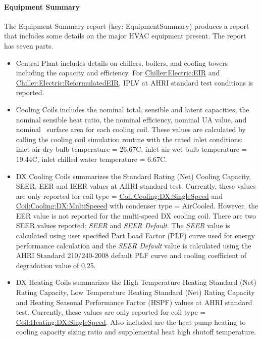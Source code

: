 \paragraph{Equipment Summary}\label{equipment-summary}

The Equipment Summary report (key: EquipmentSummary) produces a report that includes some details on the major HVAC equipment present. The report has seven parts.

\begin{itemize}
\item
  Central Plant includes details on chillers, boilers, and cooling towers including the capacity and efficiency. For \hyperref[chillerelectriceir]{Chiller:Electric:EIR} and \hyperref[chillerelectricreformulatedeir]{Chiller:Electric:ReformulatedEIR}, IPLV at AHRI standard test conditions is reported.
\item
  Cooling Coils includes the nominal total, sensible and latent capacities, the nominal sensible heat ratio, the nominal efficiency, nominal UA value, and nominal~ surface area for each cooling coil. These values are calculated by calling the cooling coil simulation routine with the rated inlet conditions: inlet air dry bulb temperature = 26.67C, inlet air wet bulb temperature = 19.44C, inlet chilled water temperature = 6.67C.
\item
  DX Cooling Coils summarizes the Standard Rating (Net) Cooling Capacity, SEER, EER and IEER values at AHRI standard test. Currently, these values are only reported for coil type = \hyperref[coilcoolingdxsinglespeed]{Coil:Cooling:DX:SingleSpeed} and \hyperref[coilcoolingdxmultispeed]{Coil:Cooling:DX:MultiSpeeed} with condenser type = AirCooled. However, the EER value is not reported for the multi-speed DX cooling coil. There are two SEER values reported: \textit{SEER} and \textit{SEER Default}. The \textit{SEER} value is calculated using user specified Part Load Factor (PLF) curve used for energy performance calculation and the \textit{SEER Default} value is calculated using the AHRI Standard 210/240-2008 default PLF curve and cooling coefficient of degradation value of 0.25.
\item
  DX Heating Coils summarizes the High Temperature Heating Standard (Net) Rating Capacity, Low Temperature Heating Standard (Net) Rating Capacity and Heating Seasonal Performance Factor (HSPF) values at AHRI standard test. Currently, these values are only reported for coil type = \hyperref[coilheatingdxsinglespeed]{Coil:Heating:DX:SingleSpeed}. Also included are the heat pump heating to cooling capacity sizing ratio and supplemental heat high shutoff temperature.

\end{itemize}
